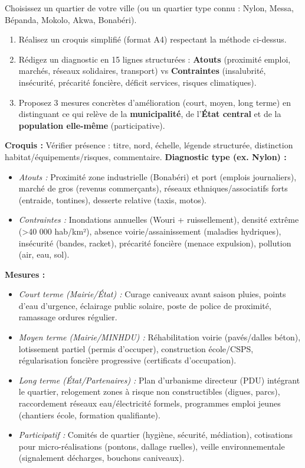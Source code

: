 \documentclass[11pt]{article}
\begin{document}
\begin{exercice}
Choisissez un quartier de votre ville (ou un quartier type connu : Nylon, Messa, Bépanda, Mokolo, Akwa, Bonabéri).
\begin{enumerate}
    \item Réalisez un croquis simplifié (format A4) respectant la méthode ci-dessus.
    \item Rédigez un diagnostic en 15 lignes structurées : \textbf{Atouts} (proximité emploi, marchés, réseaux solidaires, transport) vs \textbf{Contraintes} (insalubrité, insécurité, précarité foncière, déficit services, risques climatiques).
    \item Proposez 3 mesures concrètes d'amélioration (court, moyen, long terme) en distinguant ce qui relève de la \textbf{municipalité}, de l'\textbf{État central} et de la \textbf{population elle-même} (participative).
\end{enumerate}
\end{exercice}

\begin{corrige}
\textbf{Croquis :} Vérifier présence : titre, nord, échelle, légende structurée, distinction habitat/équipements/risques, commentaire.
\textbf{Diagnostic type (ex. Nylon) :}
\begin{itemize}
    \item \textit{Atouts :} Proximité zone industrielle (Bonabéri) et port (emplois journaliers), marché de gros (revenus commerçants), réseaux ethniques/associatifs forts (entraide, tontines), desserte relative (taxis, motos).
    \item \textit{Contraintes :} Inondations annuelles (Wouri + ruissellement), densité extrême (>40 000 hab/km²), absence voirie/assainissement (maladies hydriques), insécurité (bandes, racket), précarité foncière (menace expulsion), pollution (air, eau, sol).
\end{itemize}
\textbf{Mesures :}
\begin{itemize}
    \item \textit{Court terme (Mairie/État) :} Curage caniveaux avant saison pluies, points d'eau d'urgence, éclairage public solaire, poste de police de proximité, ramassage ordures régulier.
    \item \textit{Moyen terme (Mairie/MINHDU) :} Réhabilitation voirie (pavés/dalles béton), lotissement partiel (permis d'occuper), construction école/CSPS, régularisation foncière progressive (certificats d'occupation).
    \item \textit{Long terme (État/Partenaires) :} Plan d'urbanisme directeur (PDU) intégrant le quartier, relogement zones à risque non constructibles (digues, parcs), raccordement réseaux eau/électricité formels, programmes emploi jeunes (chantiers école, formation qualifiante).
    \item \textit{Participatif :} Comités de quartier (hygiène, sécurité, médiation), cotisations pour micro-réalisations (pontons, dallage ruelles), veille environnementale (signalement décharges, bouchons caniveaux).
\end{itemize}
\end{corrige}
\end{document}
